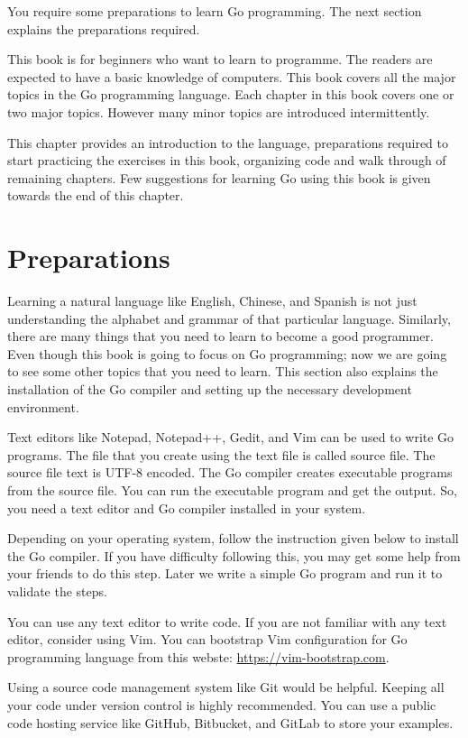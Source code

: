 You require some preparations to learn Go programming. The next section explains
the preparations required.

This book is for beginners who want to learn to programme. The readers are
expected to have a basic knowledge of computers. This book covers all the major
topics in the Go programming language. Each chapter in this book covers one or
two major topics. However many minor topics are introduced intermittently.

This chapter provides an introduction to the language, preparations required to
start practicing the exercises in this book, organizing code and walk through of
remaining chapters. Few suggestions for learning Go using this book is given
towards the end of this chapter.

\section{Preparations}

Learning a natural language like English, Chinese, and Spanish is not just
understanding the alphabet and grammar of that particular language. Similarly,
there are many things that you need to learn to become a good programmer. Even
though this book is going to focus on Go programming; now we are going to see
some other topics that you need to learn. This section also explains the
installation of the Go compiler and setting up the necessary development
environment.

Text editors like Notepad, Notepad++, Gedit, and Vim can be used to write Go
programs. The file that you create using the text file is called source file.
The source file text is UTF-8 encoded. The Go compiler creates executable
programs from the source file. You can run the executable program and get the
output. So, you need a text editor and Go compiler installed in your system.

Depending on your operating system, follow the instruction given below to
install the Go compiler. If you have difficulty following this, you may get some
help from your friends to do this step. Later we write a simple Go program and
run it to validate the steps.

You can use any text editor to write code. If you are not familiar with any text
editor, consider using Vim. You can bootstrap Vim configuration for Go
programming language from this webste: \url{https://vim-bootstrap.com}.

Using a source code management system like Git would be helpful. Keeping all
your code under version control is highly recommended. You can use a public code
hosting service like GitHub, Bitbucket, and GitLab to store your examples.

